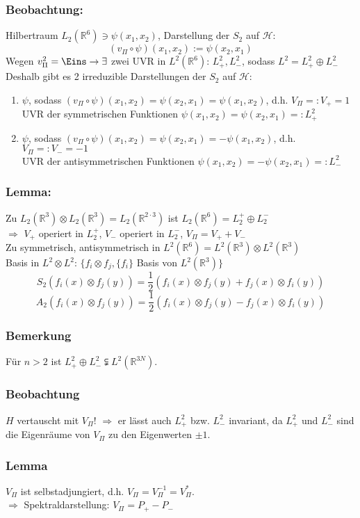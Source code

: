 \documentclass[twoside,a4paper]{scrartcl}
\newcommand{\R}{\mathbb{R}}
\renewcommand{\1}{\mathds{1}}
\newcommand{\Ra}{\Rightarrow}
\newcommand{\ra}{\rightarrow}
\renewcommand{\H}{\mathcal{H}}
\renewcommand{\R}{\mathbb{R}}
\begin{document}
\subsubsection*{Beobachtung:}
Hilbertraum $L_2(\R^6) \ni \psi(x_1,x_2)$, Darstellung der $S_2$ auf $\H$:
$$(v_\Pi \circ \psi)(x_1,x_2):=\psi(x_2,x_1)$$
Wegen $v_\Pi^2=\Eins \ra \exists $ zwei UVR in $L^2(\R^6)$: $L^2_+, L^2_-$, sodass $L^2=L^2_+ \oplus L^2_-$\\ 
Deshalb gibt es 2 irreduzible Darstellungen der $S_2$ auf $\H$:
\begin{enumerate}
\item $\psi$, sodass $(v_\Pi\circ \psi)(x_1,x_2)=\psi(x_2,x_1)=\psi(x_1,x_2)$, d.h. $V_\Pi=:V_+=1$\\
UVR der symmetrischen Funktionen $\psi(x_1,x_2)=\psi(x_2,x_1)=:L_+^2$
\item $\psi$, sodass $(v_\Pi\circ \psi)(x_1,x_2)=\psi(x_2,x_1)=-\psi(x_1,x_2)$, d.h. $V_\Pi=:V_-=-1$\\
UVR der antisymmetrischen Funktionen $\psi(x_1,x_2)=-\psi(x_2,x_1)=:L_-^2$
\end{enumerate}
\subsubsection*{Lemma:}
Zu $L_2(\R^3)\otimes L_2(\R^3)=L_2(\R^{2\cdot 3})$ ist $L_2(\R^6)=L_2^+\oplus L_2^-$\\
$\Ra$ $V_+$ operiert in $L_2^+$, $V_-$ operiert in $L_2^-$, $V_\Pi=V_++V_-$\\
Zu symmetrisch, antisymmetrisch in $L^2(\R^6)=L^2(\R^3)\otimes L^2(\R^3)$\\
Basis in $L^2 \otimes L^2$: $\{f_i \otimes f_j, \{f_i\}$ Basis von $L^2(\R^3)\}$
$$S_2 (f_i(x)\otimes f_j(y))=\frac{1}{2}(f_i(x)\otimes f_j(y)+ f_j(x)\otimes f_i(y))$$
$$A_2 (f_i(x)\otimes f_j(y))=\frac{1}{2}(f_i(x)\otimes f_j(y)- f_j(x)\otimes f_i(y))$$

\subsubsection*{Bemerkung}
Für $n>2$ ist $L_+^2 \oplus L_-^2 \subsetneqq L^2(\R^{3N})$.
\subsubsection*{Beobachtung}
$H$ vertauscht mit $V_\Pi$! 
$\Ra $ er lässt auch $L_+^2$ bzw. $L_-^2$ invariant, da $L_+^2$ und $L_-^2$ sind die Eigenräume von $V_\Pi$ zu den Eigenwerten $\pm 1$.
\subsubsection*{Lemma}
$V_\Pi$ ist selbstadjungiert, d.h. $V_\Pi=V_\Pi^{-1}=V_\Pi^*$.\\
$\Ra$ Spektraldarstellung: $V_\Pi=P_+-P_-$
\end{document}
